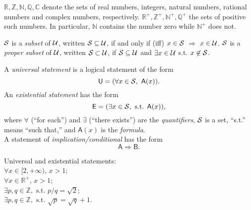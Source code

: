 \begin{ntn}
$\mathbb{R}, \mathbb{Z}, \mathbb{N}, \mathbb{Q}, \mathbb{C}$
 denote 
 the sets of real numbers, integers, natural numbers,
 rational numbers and complex numbers, respectively.
$\mathbb{R}^+, \mathbb{Z}^+, \mathbb{N}^+, \mathbb{Q}^+$
the sets of positive such numbers.
In particular, $\mathbb{N}$ contains the number zero while
 $\mathbb{N}^+$ does not.
\end{ntn}

\begin{defn}
  \label{def:subsets}
  ${\cal S}$ is a \emph{subset} of ${\cal U}$,
  written ${\cal S}\subseteq {\cal U}$,
  if and only if (iff) $x\in {\cal S}$ $\Rightarrow$ $x\in {\cal U}$.
  ${\cal S}$ is a \emph{proper subset} of ${\cal U}$,
  written ${\cal S}\subset {\cal U}$,
  if ${\cal S}\subseteq {\cal U}$
  and $\exists x\in {\cal U}$ s.t. $x\not\in{\cal S}$.
\end{defn}

\begin{defn}
\label{def:uni_exist}
A \emph{universal statement} is a logical statement 
 of the form
\begin{equation}
  \mathsf{U} = (\forall x\in {\cal S},\ \mathsf{A}(x) ).
\end{equation}
An \emph{existential statement} has the form
\begin{equation}
  \mathsf{E} = (\exists x\in {\cal S},\text{ s.t. } \mathsf{A}(x)),
\end{equation}
 where 
 $\forall$ (``for each'') and $\exists$ (``there exists'')
 are the \emph{quantifiers}, ${\cal S}$ is a set,
 ``s.t.'' means ``such that,''
 and $\mathsf{A}(x)$ is the \emph{formula}.\\
A statement of \emph{implication/conditional}
 has the form
 \begin{equation}
   \mathsf{A}\Rightarrow \mathsf{B}.
 \end{equation}
\end{defn}

 \begin{exm}
   Universal and existential statements:\\
   $\forall x\in[2,+\infty)$, $x>1$;\\
   $\forall x\in \mathbb{R}^+$, $x>1$;\\
   $\exists p,q\in \mathbb{Z}, \text{ s.t. } p/q = \sqrt{2}$;\\
   $\exists p,q\in \mathbb{Z}, \text{ s.t. } \sqrt{p} = \sqrt{q}+1$.
 \end{exm}

